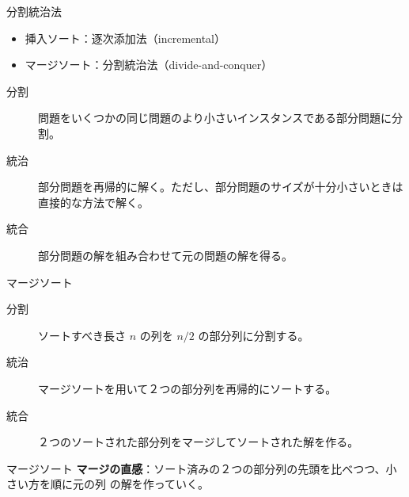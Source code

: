 \documentclass[unicode,11pt,aspectratio=169,notes]{beamer} %
\begin{document}
\begin{frame}{分割統治法}
  \begin{itemize}
    \item 挿入ソート：逐次添加法（incremental）
    \item マージソート：分割統治法（divide-and-conquer）
  \end{itemize}
  \begin{description}
    \item[分割] 問題をいくつかの同じ問題のより小さいインスタンスである部分問題に分割。
    \item[統治] 部分問題を再帰的に解く。ただし、部分問題のサイズが十分小さいときは
    直接的な方法で解く。
    \item[統合] 部分問題の解を組み合わせて元の問題の解を得る。
  \end{description}
\end{frame}


\begin{frame}{マージソート}
  \begin{description}
    \item[分割] ソートすべき長さ $n$ の列を $n/2$ の部分列に分割する。
    \item[統治] マージソートを用いて２つの部分列を再帰的にソートする。
    \item[統合] ２つのソートされた部分列をマージしてソートされた解を作る。
  \end{description}
\end{frame}


\begin{frame}{マージソート}
  \textbf{マージの直感}：ソート済みの２つの部分列の先頭を比べつつ、小さい方を順に元の列
  の解を作っていく。
\end{frame}
\end{document}
